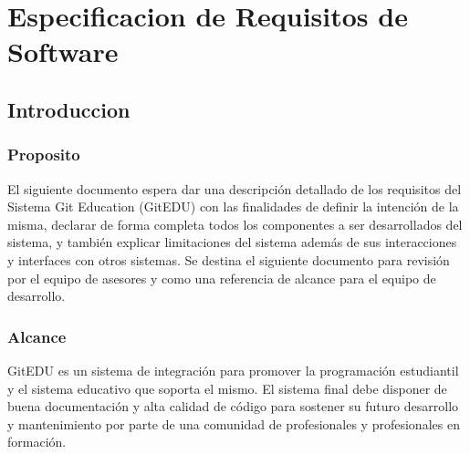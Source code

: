 

\chapter{Especificacion de Requisitos de Software}
\label{ersDoc}

\section{Introduccion}

\subsection{Proposito}
El siguiente documento espera dar una descripción detallado de los requisitos del Sistema Git Education (GitEDU) con las finalidades de definir la intención de la misma, declarar de forma completa todos los componentes a ser desarrollados del sistema, y también explicar limitaciones del sistema además de sus interacciones y interfaces con otros sistemas. Se destina el siguiente documento para revisión por el equipo de asesores y como una referencia de alcance para el equipo de desarrollo.

\subsection{Alcance}
GitEDU es un sistema de integración para promover la programación estudiantil y el sistema educativo que soporta el mismo. El sistema final debe disponer de buena documentación y alta calidad de código para sostener su futuro desarrollo y mantenimiento por parte de una comunidad de profesionales y profesionales en formación.

